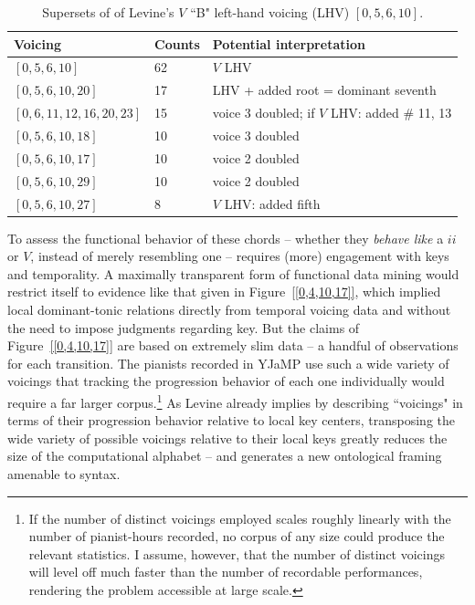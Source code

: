 \begin{table}%
  \caption{Supersets of of Levine's $V$ ``B" left-hand voicing (LHV) $[0,5,6,10]$.}
  \centering
\begin{tabular}{l| l | l}
\hline\hline
Voicing & Counts & Potential interpretation \\ [0.5ex]
\hline
$[0,5,6,10]$ & 62 & $V$ LHV \\
$[0,5,6,10,20]$ & 17 & LHV + added root = dominant seventh \\
$[0,6,11,12,16,20,23]$ & 15 & voice 3 doubled; if $V$ LHV: added \# 11, 13 \\
$[0,5,6,10,18]$ & 10 & voice 3 doubled \\
$[0,5,6,10,17]$ & 10 & voice 2 doubled \\
$[0,5,6,10,29]$ & 10 & voice 2 doubled \\
$[0,5,6,10,27]$ & 8 & $V$ LHV: added fifth \\[1ex]
\hline
\end{tabular}
\label{b_V_lhv}
\end{table}

To assess the functional behavior of these chords -- whether they \emph{behave like} a $ii$ or $V$, instead of merely resembling one -- requires (more) engagement with keys and temporality.  A maximally transparent form of functional data mining would restrict itself to evidence like that given in Figure~\ref{[0,4,10,17]}, which implied local dominant-tonic relations directly from temporal voicing data and without the need to impose judgments regarding key.  But the claims of  Figure~\ref{[0,4,10,17]} are based on extremely slim data -- a handful of observations for each transition.  The pianists recorded in YJaMP use such a wide variety of voicings that tracking the progression behavior of each one individually would require a far larger corpus.\footnote{If the number of distinct voicings employed scales roughly linearly with the number of pianist-hours recorded, no corpus of any size could produce the relevant statistics.  I assume, however, that the number of distinct voicings will level off much faster than the number of recordable performances, rendering the problem accessible at large scale.}  As Levine already implies by describing ``voicings" in terms of their progression behavior relative to local key centers, transposing the wide variety of possible voicings relative to their local keys greatly reduces the size of the computational alphabet -- and generates a new ontological framing amenable to syntax.

